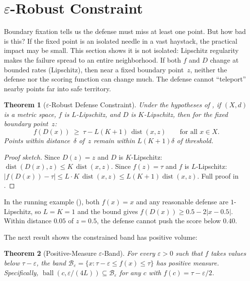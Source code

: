 \documentclass[11pt]{article}
\newtheorem{theorem}{Theorem}[section]
\newcommand{\dist}{\operatorname{dist}}
\begin{document}
\section{$\varepsilon$-Robust Constraint}
\label{sec:eps-robust}

Boundary fixation tells us the defense must miss at least one
point. But how bad is this? If the fixed point is an isolated
needle in a vast haystack, the practical impact may be small. This
section shows it is not isolated: Lipschitz regularity makes the
failure spread to an entire neighborhood. If both $f$ and $D$ change at bounded
rates (Lipschitz), then near a fixed boundary point~$z$, neither the
defense nor the scoring function can change much. The defense cannot
``teleport'' nearby points far into safe territory.

\begin{theorem}[$\varepsilon$-Robust Defense Constraint]
\label{thm:eps-robust}
Under the hypotheses of , if $(X,d)$ is a metric
space, $f$ is $L$-Lipschitz, and $D$ is $K$-Lipschitz, then for
the fixed boundary point~$z$:
\begin{equation}
  f(D(x)) \;\geq\; \tau - L(K+1)\,\dist(x, z)
  \qquad \text{for all } x \in X.
\end{equation}
Points within distance~$\delta$ of~$z$ remain within
$L(K{+}1)\delta$ of threshold.
\end{theorem}

\begin{proof}[Proof sketch]
Since $D(z)=z$ and $D$ is $K$-Lipschitz:
$\dist(D(x),z) \leq K\,\dist(x,z)$. Since $f(z)=\tau$ and $f$ is
$L$-Lipschitz:
$|f(D(x)) - \tau| \leq L \cdot K\,\dist(x,z) \leq L(K{+}1)\dist(x,z)$.
Full proof in .
\end{proof}

In the running example (), both $f(x) = x$ and any
reasonable defense are $1$-Lipschitz, so $L = K = 1$ and the bound
gives $f(D(x)) \geq 0.5 - 2|x - 0.5|$. Within distance $0.05$ of
$z = 0.5$, the defense cannot push the score below $0.40$.

The next result shows the constrained band has positive volume:

\begin{theorem}[Positive-Measure $\varepsilon$-Band]
\label{thm:band-measure}
For every $\varepsilon > 0$ such that $f$ takes values below
$\tau - \varepsilon$, the band
$\mathcal{B}_\varepsilon = \{x : \tau - \varepsilon \leq f(x)
\leq \tau\}$ has positive measure.
Specifically, $\operatorname{ball}(c, \varepsilon/(4L)) \subseteq
\mathcal{B}_\varepsilon$ for any $c$ with $f(c) = \tau - \varepsilon/2$.
\end{theorem}
\end{document}
